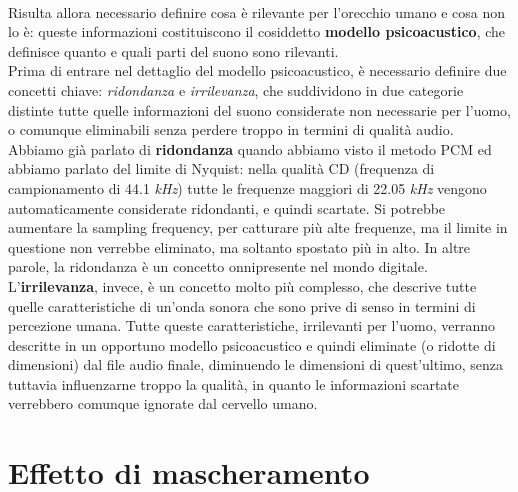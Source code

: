 		\\
		Risulta allora necessario definire cosa è rilevante per l'orecchio umano e cosa non lo è: queste informazioni costituiscono il cosiddetto \textbf{modello psicoacustico}, che definisce quanto e quali parti del suono sono rilevanti.\\
		Prima di entrare nel dettaglio del modello psicoacustico, è necessario definire due concetti chiave: \textit{ridondanza} e \textit{irrilevanza}, che suddividono in due categorie distinte tutte quelle informazioni del suono considerate non necessarie per l'uomo, o comunque eliminabili senza perdere troppo in termini di qualità audio.\\
		Abbiamo già parlato di \textbf{ridondanza} quando abbiamo visto il metodo PCM ed abbiamo parlato del limite di Nyquist: nella qualità CD (frequenza di campionamento di 44.1 \textit{kHz}) tutte le frequenze maggiori di 22.05 \textit{kHz} vengono automaticamente considerate ridondanti, e quindi scartate. Si potrebbe aumentare la sampling frequency, per catturare più alte frequenze, ma il limite in questione non verrebbe eliminato, ma soltanto spostato più in alto. In altre parole, la ridondanza è un concetto onnipresente nel mondo digitale.\\
		L'\textbf{irrilevanza}, invece, è un concetto molto più complesso, che descrive tutte quelle caratteristiche di un'onda sonora che sono prive di senso in termini di percezione umana. Tutte queste caratteristiche, irrilevanti per l'uomo, verranno descritte in un opportuno modello psicoacustico e quindi eliminate (o ridotte di dimensioni) dal file audio finale, diminuendo le dimensioni di quest'ultimo, senza tuttavia influenzarne troppo la qualità, in quanto le informazioni scartate verrebbero comunque ignorate dal cervello umano.
		
	\section{Effetto di mascheramento} \label{sec:effetto_mascheramento}
		

